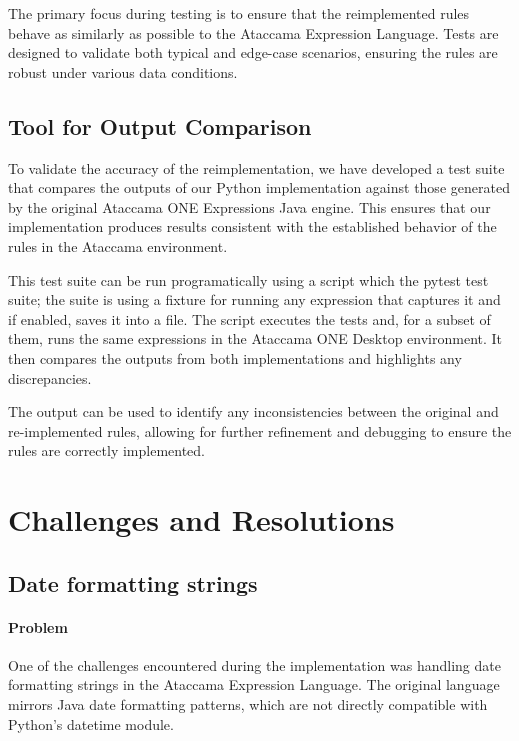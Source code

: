 The primary focus during testing is to ensure that the reimplemented rules behave as similarly as possible to the Ataccama Expression Language. Tests are designed to validate both typical and edge-case scenarios, ensuring the rules are robust under various data conditions.

\subsection{Tool for Output Comparison}

To validate the accuracy of the reimplementation, we have developed a test suite that compares the outputs of our Python implementation against those generated by the original Ataccama ONE Expressions Java engine. This ensures that our implementation produces results consistent with the established behavior of the rules in the Ataccama environment.

This test suite can be run programatically using a script which the pytest test suite; the suite is using a fixture for running any expression that captures it and if enabled, saves it into a file. The script executes the tests and, for a subset of them, runs the same expressions in the Ataccama ONE Desktop environment. It then compares the outputs from both implementations and highlights any discrepancies.

The output can be used to identify any inconsistencies between the original and re-implemented rules, allowing for further refinement and debugging to ensure the rules are correctly implemented.

\section{Challenges and Resolutions}

\subsection{Date formatting strings}
\paragraph{Problem}

One of the challenges encountered during the implementation was handling date formatting strings in the Ataccama Expression Language. The original language mirrors Java date formatting patterns, which are not directly compatible with Python’s datetime module. \cite{noauthor_datetimeformatter_nodate}

